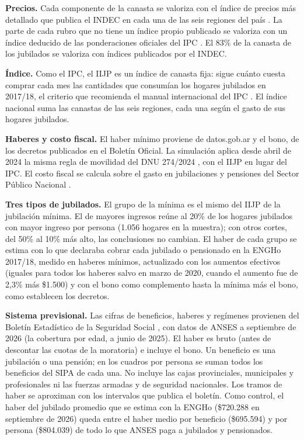 \documentclass[10pt,a4paper]{article}
\begin{document}
\textbf{Precios.} Cada componente de la canasta se valoriza con el índice de precios más detallado que publica el INDEC en cada una de las seis regiones del país \citep{INDEC2026_IPC}. La parte de cada rubro que no tiene un índice propio publicado se valoriza con un índice deducido de las ponderaciones oficiales del IPC \citep{INDEC2019_IPC_metodologia}. El 83\% de la canasta de los jubilados se valoriza con índices publicados por el INDEC.

\textbf{Índice.} Como el IPC, el IIJP es un índice de canasta fija: sigue cuánto cuesta comprar cada mes las cantidades que consumían los hogares jubilados en 2017/18, el criterio que recomienda el manual internacional del IPC \citep{IMF2020_CPI_manual}. El índice nacional suma las canastas de las seis regiones, cada una según el gasto de sus hogares jubilados.

\textbf{Haberes y costo fiscal.} El haber mínimo proviene de datos.gob.ar \citep{MECON2026_haber_minimo} y el bono, de los decretos publicados en el Boletín Oficial. La simulación aplica desde abril de 2024 la misma regla de movilidad del DNU 274/2024 \citep{PEN2024_DNU274}, con el IIJP en lugar del IPC. El costo fiscal se calcula sobre el gasto en jubilaciones y pensiones del Sector Público Nacional \citep{MECON2026_IMIG}.

\textbf{Tres tipos de jubilados.} El grupo de la mínima es el mismo del IIJP de la jubilación mínima. El de mayores ingresos reúne al 20\% de los hogares jubilados con mayor ingreso por persona (1.056 hogares en la muestra); con otros cortes, del 50\% al 10\% más alto, las conclusiones no cambian. El haber de cada grupo se estima con lo que declaraba cobrar cada jubilado o pensionado en la ENGHo 2017/18, medido en haberes mínimos, actualizado con los aumentos efectivos (iguales para todos los haberes salvo en marzo de 2020, cuando el aumento fue de 2,3\% más \$1.500) y con el bono como complemento hasta la mínima más el bono, como establecen los decretos.

\textbf{Sistema previsional.} Las cifras de beneficios, haberes y regímenes provienen del Boletín Estadístico de la Seguridad Social \citep{STESS2026_BESS}, con datos de ANSES a septiembre de 2026 (la cobertura por edad, a junio de 2025). El haber es bruto (antes de descontar las cuotas de la moratoria) e incluye el bono. Un beneficio es una jubilación o una pensión; en los cuadros por persona se suman todos los beneficios del SIPA de cada una. No incluye las cajas provinciales, municipales y profesionales ni las fuerzas armadas y de seguridad nacionales. Los tramos de haber se aproximan con los intervalos que publica el boletín. Como control, el haber del jubilado promedio que se estima con la ENGHo (\$720.288 en septiembre de 2026) queda entre el haber medio por beneficio (\$695.594) y por persona (\$804.039) de todo lo que ANSES paga a jubilados y pensionados.
\end{document}
